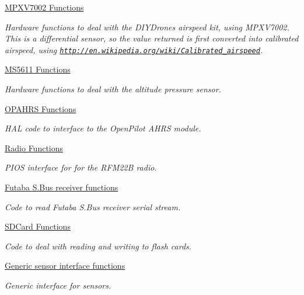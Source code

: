 \begin{DoxyCompactItemize}
\hyperlink{group___p_i_o_s___m_p_x_v7002}{M\-P\-X\-V7002 Functions}
\begin{DoxyCompactList}\small\item\em Hardware functions to deal with the D\-I\-Y\-Drones airspeed kit, using M\-P\-X\-V7002. This is a differential sensor, so the value returned is first converted into calibrated airspeed, using \href{http://en.wikipedia.org/wiki/Calibrated_airspeed}{\tt http\-://en.\-wikipedia.\-org/wiki/\-Calibrated\-\_\-airspeed}. \end{DoxyCompactList}\item 
\hyperlink{group___p_i_o_s___m_s5611}{M\-S5611 Functions}
\begin{DoxyCompactList}\small\item\em Hardware functions to deal with the altitude pressure sensor. \end{DoxyCompactList}\item 
\hyperlink{group___p_i_o_s___o_p_a_h_r_s}{O\-P\-A\-H\-R\-S Functions}
\begin{DoxyCompactList}\small\item\em H\-A\-L code to interface to the Open\-Pilot A\-H\-R\-S module. \end{DoxyCompactList}\item 
\hyperlink{group___p_i_o_s___r_f_m22_b}{Radio Functions}
\begin{DoxyCompactList}\small\item\em P\-I\-O\-S interface for for the R\-F\-M22\-B radio. \end{DoxyCompactList}\item 
\hyperlink{group___p_i_o_s___s_bus}{Futaba S.\-Bus receiver functions}
\begin{DoxyCompactList}\small\item\em Code to read Futaba S.\-Bus receiver serial stream. \end{DoxyCompactList}\item 
\hyperlink{group___p_i_o_s___s_d_c_a_r_d}{S\-D\-Card Functions}
\begin{DoxyCompactList}\small\item\em Code to deal with reading and writing to flash cards. \end{DoxyCompactList}\item 
\hyperlink{group___p_i_o_s___s_e_n_s_o_r_s}{Generic sensor interface functions}
\begin{DoxyCompactList}\small\item\em Generic interface for sensors. \end{DoxyCompactList}\item 

\end{DoxyCompactItemize}
